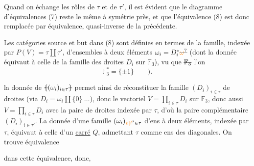 Quand  on échange les rôles de $\tau$ et de $\tau'$, il est évident que le diagramme d'équivalences (7) reste le même à symétrie près, et que l'équivalence (8) est donc remplacée par  équivalence,  quasi-inverse de la précédente.

Les catégories source et but dans (8) sont définies en termes de la famille, indexée par $P(V)=\tau\amalg\tau'$, d'ensembles à deux éléments $\omega_i=D_i^*\deleted{\unsure{\omega}}$ (dont la donnée équivaut à celle de la famille des droites  $D_i$ sur $\mathbb F_3$),
vu que $\deleted{\mathbb F_3}$ l'on 
\[
\mathbb F_3^*=\{\pm1\}\qquad\big).
\]

  la donnée de $\deleted{\{}(\omega_i)_{i\in\tau}\deleted{\}}$ permet ainsi de réconstituer  la famille $(D_i)_{i\in\tau}$ de droites  (via $D_i=\omega_i\amalg\{0\}\ \ldots$), donc le vectoriel $V=\prod_{i\in\tau}D_i$ sur $\mathbb F_3$, donc aussi  $V=\prod_{i\in\tau}D_i$ avec la paire de droites indexée par $\tau$, d'où la paire complémentaire $(D_i)_{i\in\tau'}$. La  donnée d'une famille $(\omega_i)_{\unsure{v|i}\in\tau}$ d'ens à deux éléments, indexée par $\tau$, équivaut à celle d'un \uline{carré}  $Q$, admettant $\tau$ comme ens des diagonales. On trouve   équivalence


dans cette équivalence, donc,  

